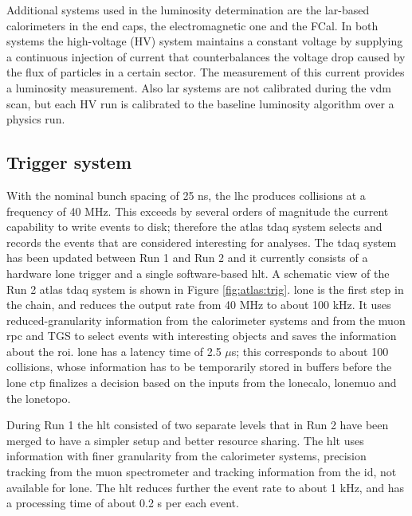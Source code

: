 Additional systems used in the luminosity determination are the \gls{lar}-based calorimeters in the end caps, the electromagnetic one and the FCal. In both systems the high-voltage (HV) system maintains a constant voltage by supplying a continuous injection of current that counterbalances the voltage drop caused by the flux of particles in a certain sector. The measurement of this current provides a luminosity measurement. Also \gls{lar} systems are not calibrated during the \gls{vdm} scan, but each HV run is calibrated to the baseline luminosity algorithm over a physics run.  


\subsection{Trigger system}
\label{sec:cern:trigger}

With the nominal bunch spacing of 25 ns, the \gls{lhc} produces collisions at a frequency of 40 MHz. This exceeds by several orders of magnitude the current capability to write events to disk; therefore the \gls{atlas} \gls{tdaq} system selects and records the events that are considered interesting for analyses. The \gls{tdaq} system has been updated between Run 1 and Run 2 \cite{Aaboud:2016leb} and it currently consists of a  hardware \gls{lone} trigger and a single software-based \gls{hlt}. A schematic view of the Run 2 \gls{atlas} \gls{tdaq} system is shown in Figure \ref{fig:atlas:trig}. \gls{lone} is the first step in the chain, and reduces the output rate from 40 MHz to about 100 kHz. It uses reduced-granularity information from the calorimeter systems and from the muon \gls{rpc} and TGS to select events with interesting objects and saves the information about the \gls{roi}. \gls{lone} has a latency time of 2.5 $\mu$s; this corresponds to about 100 collisions, whose information has to be temporarily stored in buffers before the \gls{lone} \gls{ctp} finalizes a decision based on the inputs from the \gls{lonecalo}, \gls{lonemuo} and the \gls{lonetopo}. 

During Run 1 the \gls{hlt} consisted of two separate levels that in Run 2 have been merged to have a simpler setup and better resource sharing. The \gls{hlt} uses information with finer granularity from the calorimeter systems, precision tracking from the muon spectrometer and tracking information from the \gls{id}, not available for \gls{lone}. The \gls{hlt} reduces further the event rate to about 1 kHz, and has a processing time of about 0.2 s per each event. 

